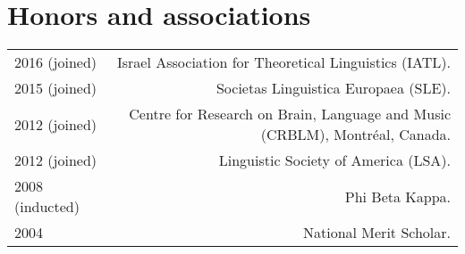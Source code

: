 \documentclass[12pt,letterpaper,twoside]{article}
\makeatletter
\newenvironment{cvsection}{%
  \begin{longtable}[l]{@{}L@{} @{}R@{}}
}{%
  \end{longtable}
}
\makeatother
\begin{document}
\section*{Honors and associations}

\begin{cvsection}
  2016 {\footnotesize (joined)} & Israel Association for Theoretical Linguistics (IATL).\\
  2015 {\footnotesize (joined)} & Societas Linguistica Europaea (SLE).\\
  2012 {\footnotesize (joined)} & Centre for Research on Brain, Language and Music (CRBLM), Montr\'{e}al, Canada.\\
  2012 {\footnotesize (joined)} & Linguistic Society of America (LSA).\\
  2008 {\footnotesize (inducted)} & Phi Beta Kappa.\\
  2004 & National Merit Scholar.\\
\end{cvsection}
\end{document}
